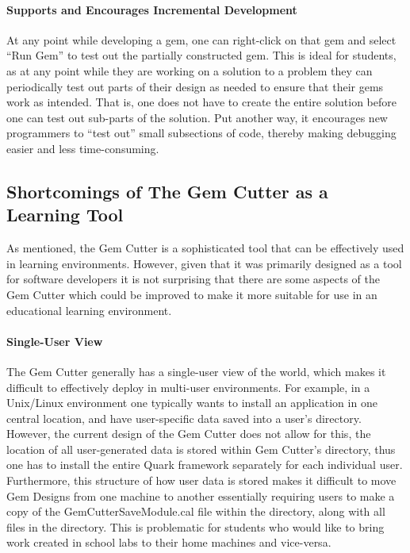 \paragraph{Supports and Encourages Incremental Development}

At any point while developing a gem, one can right-click on that gem and select ``Run Gem'' to test out the partially constructed gem.  This is ideal for students, as at any point while they are working on a solution to a problem they can periodically test out parts of their design as needed to ensure that their gems work as intended.  That is, one does not have to create the entire solution before one can test out sub-parts of the solution.  Put another way, it encourages new programmers to ``test out'' small subsections of code, thereby making debugging easier and less time-consuming.

\subsection{Shortcomings of The Gem Cutter as a Learning Tool}
\label{sec:gemCutterShortcomings}

As mentioned, the Gem Cutter is a sophisticated tool that can be effectively used in learning environments.  However, given that it was primarily designed as a tool for software developers it is not surprising that there are some aspects of the Gem Cutter which could be improved to make it more suitable for use in an educational learning environment.

\paragraph{Single-User View}

The Gem Cutter generally has a single-user view of the world, which makes it difficult to effectively deploy in multi-user environments.  For example, in a Unix/Linux environment one typically wants to install an application in one central location, and have user-specific data saved into a user's  directory.  However, the current design of the Gem Cutter does not allow for this, the location of all user-generated data is stored within Gem Cutter's  directory, thus one has to install the entire Quark framework separately for each individual user.  Furthermore, this structure of how user data is stored makes it difficult to move Gem Designs from one machine to another essentially requiring users to make a copy of the GemCutterSaveModule.cal file within the  directory, along with all files in the  directory.  This is problematic for students who would like to bring work created in school labs to their home machines and vice-versa.

